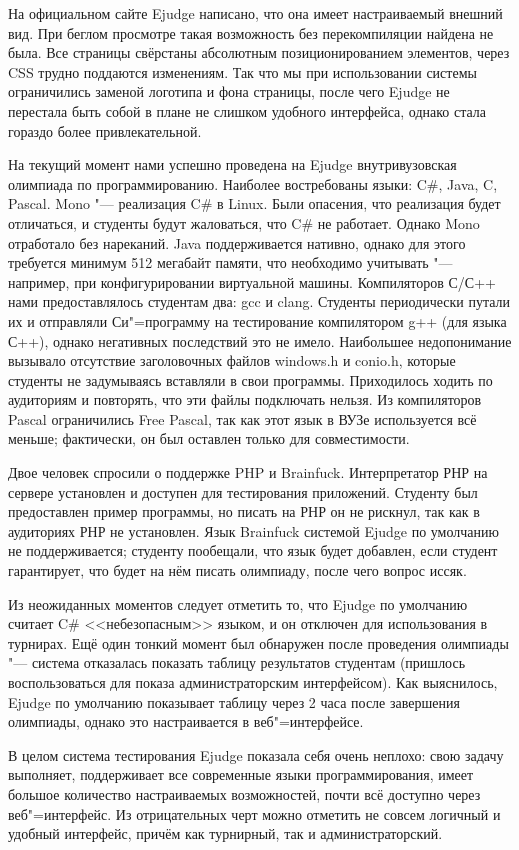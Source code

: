 \documentclass[10pt, a5paper]{article}
\begin{document}
На официальном сайте Ejudge написано, что она имеет настраиваемый внешний вид. При беглом просмотре такая возможность без перекомпиляции найдена не была. Все страницы свёрстаны абсолютным позиционированием элементов, через CSS трудно поддаются изменениям. Так что мы при использовании системы ограничились заменой логотипа и фона страницы, после чего Ejudge не перестала быть собой в плане не слишком удобного интерфейса, однако стала гораздо более привлекательной.

На текущий момент нами успешно проведена на Ejudge внутривузовская олимпиада по программированию. Наиболее востребованы языки: C\#, Java, C, Pascal. Mono "--- реализация C\# в Linux. Были опасения, что реализация будет отличаться, и студенты будут жаловаться, что C\# не работает. Однако Mono отработало без нареканий. Java поддерживается нативно, однако для этого требуется минимум 512 мегабайт памяти, что необходимо учитывать "--- например, при конфигурировании виртуальной машины. Компиляторов С/С++ нами предоставлялось студентам два: gcc и clang. Студенты периодически путали их и отправляли Си"=программу на тестирование компилятором g++ (для языка С++), однако негативных последствий это не имело. Наибольшее недопонимание вызывало отсутствие заголовочных файлов windows.h и conio.h, которые студенты не задумываясь вставляли в свои программы. Приходилось ходить по аудиториям и повторять, что эти файлы подключать нельзя. Из компиляторов Pascal ограничились Free Pascal, так как этот язык в ВУЗе используется всё меньше; фактически, он был оставлен только для совместимости.

Двое человек спросили о поддержке PHP и Brainfuck. Интерпретатор РНР на сервере установлен и доступен для тестирования приложений. Студенту был предоставлен пример программы, но писать на РНР он не рискнул, так как в аудиториях РНР не установлен. Язык Brainfuck системой Ejudge по умолчанию не поддерживается; студенту пообещали, что язык будет добавлен, если студент гарантирует, что будет на нём писать олимпиаду, после чего вопрос иссяк.

Из неожиданных моментов следует отметить то, что Ejudge по умолчанию считает C\# <<небезопасным>> языком, и он отключен для использования в турнирах. Ещё один тонкий момент был обнаружен после проведения олимпиады "--- система отказалась показать таблицу результатов студентам (пришлось воспользоваться для показа администраторским интерфейсом). Как выяснилось, Ejudge по умолчанию показывает таблицу через 2 часа после завершения олимпиады, однако это настраивается в веб"=интерфейсе.

В целом система тестирования Ejudge показала себя очень неплохо: свою задачу выполняет, поддерживает все современные языки программирования, имеет большое количество настраиваемых возможностей, почти всё доступно через веб"=интерфейс. Из отрицательных черт можно отметить не совсем логичный и удобный интерфейс, причём как турнирный, так и администраторский.
\end{document}
